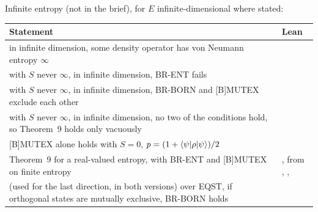 \documentclass[11pt]{article}
\begin{document}
\noindent\begin{minipage}{\textwidth}
Infinite entropy (not in the brief), for $E$ infinite-dimensional where stated:
\begin{center}
\begin{tabularx}{\textwidth}{@{}BL@{}}
\toprule
Statement & Lean \\
\midrule
in infinite dimension, some density operator has von Neumann entropy $\infty$ &
   \\
with $S$ never $\infty$, in infinite dimension, BR-ENT fails &
   \\
with $S$ never $\infty$, in infinite dimension, BR-BORN and [B]MUTEX exclude each other &
   \\
with $S$ never $\infty$, in infinite dimension, no two of the conditions hold, so Theorem~9 holds
  only vacuously &  \\
{[B]MUTEX} alone holds with $S = 0$, $p = (1 + \braket{\psi|\rho|\psi})/2$ &
   \\
Theorem~9 for a real-valued entropy, with BR-ENT and [B]MUTEX on finite entropy &
  , from ,
  , 
  \\
(used for the last direction, in both versions) over EQST, if orthogonal states are mutually
  exclusive, BR-BORN holds &  \\
\bottomrule
\end{tabularx}
\end{center}
\end{minipage}
\end{document}
